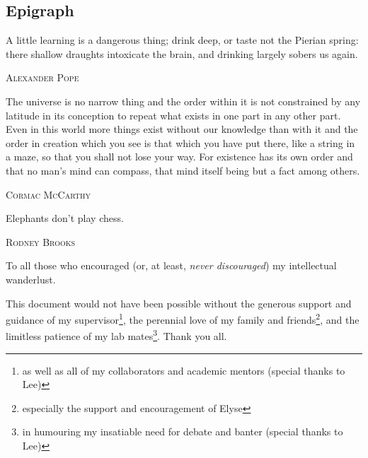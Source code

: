 \documentclass[oneandahalfspaced,twoside,12pt]{ut-thesis}
\begin{document}
\begin{preliminary}

\chapter*{Epigraph}
\epigraph{A little learning is a dangerous thing; 
drink deep, or taste not the Pierian spring: 
there shallow draughts intoxicate the brain, 
and drinking largely sobers us again.}{\textsc{Alexander Pope}}
\epigraph{The universe is no narrow thing and the order within it is not constrained by any latitude in its conception to repeat what exists in one part in any other part. Even in this world more things exist without our knowledge than with it and the order in creation which you see is that which you have put there, like a string in a maze, so that you shall not lose your way. For existence has its own order and that no man's mind can compass, that mind itself being but a fact among others.}{\textsc{Cormac McCarthy}}
\epigraph{Elephants don't play chess.}{\textsc{Rodney Brooks}}


\clearpage
	

\begin{dedication}
To all those who encouraged (or, at least, \textit{never discouraged}) my intellectual wanderlust.
\end{dedication}

\newpage  %


\begin{acknowledgements}
This document would not have been possible without the generous support and guidance of my supervisor\footnote{as well as all of my collaborators and academic mentors (special thanks to Lee)}, the perennial love of my family and friends\footnote{especially the support and encouragement of Elyse}, and the limitless patience of my lab mates\footnote{in humouring my insatiable need for debate and banter (special thanks to Lee)}. Thank you all.
\end{acknowledgements}


\end{preliminary}
\end{document}
